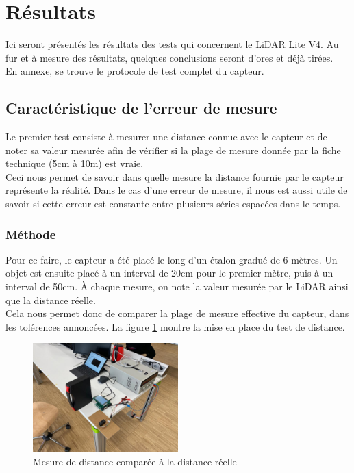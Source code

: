 \section{Résultats}

Ici seront présentés les résultats des tests qui concernent le LiDAR Lite V4. Au fur et à mesure des
résultats, quelques conclusions seront d'ores et déjà tirées.\\
En annexe, se trouve le protocole de test complet du capteur.

\subsection{Caractéristique de l'erreur de mesure}

Le premier test consiste à mesurer une distance connue avec le capteur et de noter sa valeur mesurée
afin de vérifier si la plage de mesure donnée par la fiche technique (5cm à 10m) est vraie.\\
Ceci nous permet de savoir dans quelle mesure la distance fournie par le capteur représente la réalité.
Dans le cas d'une erreur de mesure, il nous est aussi utile de savoir si cette erreur est constante 
entre plusieurs séries espacées dans le temps.

\subsubsection{Méthode}

Pour ce faire, le capteur a été placé le long d'un étalon gradué de 6 mètres. Un objet est ensuite
placé à un interval de 20cm pour le premier mètre, puis à un interval de 50cm. À chaque mesure, on 
note la valeur mesurée par le LiDAR ainsi que la distance réelle.\\
Cela nous permet donc de comparer la plage de mesure effective du capteur, dans les tolérences
annoncées. La figure \ref{fig:RealDistanceMeasures} montre la mise en place du test de distance.

\begin{figure}[H]
    \centering
    \includegraphics[width=0.5\textwidth]{Images/LiDAR/RealDistanceMes.jpeg}
    \caption{Mesure de distance comparée à la distance réelle}
    \label{fig:RealDistanceMeasures}
\end{figure}

